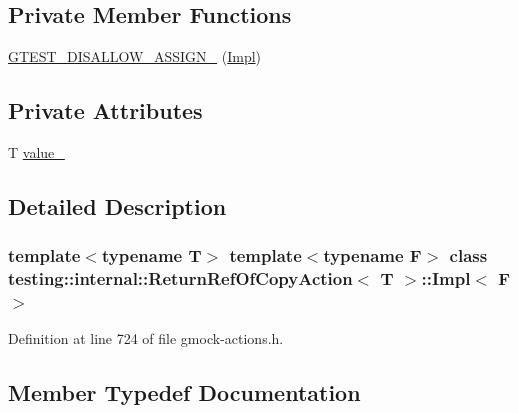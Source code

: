 \subsection*{Private Member Functions}
\begin{DoxyCompactItemize}
\item 
\hyperlink{classtesting_1_1internal_1_1ReturnRefOfCopyAction_1_1Impl_a380485fdbcb248ca267bf190202607c5}{G\+T\+E\+S\+T\+\_\+\+D\+I\+S\+A\+L\+L\+O\+W\+\_\+\+A\+S\+S\+I\+G\+N\+\_\+} (\hyperlink{classtesting_1_1internal_1_1ReturnRefOfCopyAction_1_1Impl}{Impl})
\end{DoxyCompactItemize}
\subsection*{Private Attributes}
\begin{DoxyCompactItemize}
\item 
T \hyperlink{classtesting_1_1internal_1_1ReturnRefOfCopyAction_1_1Impl_ad253b5cad2707636b8b19970708905c3}{value\+\_\+}
\end{DoxyCompactItemize}


\subsection{Detailed Description}
\subsubsection*{template$<$typename T$>$\newline
template$<$typename F$>$\newline
class testing\+::internal\+::\+Return\+Ref\+Of\+Copy\+Action$<$ T $>$\+::\+Impl$<$ F $>$}



Definition at line 724 of file gmock-\/actions.\+h.



\subsection{Member Typedef Documentation}
\mbox{\label{classtesting_1_1internal_1_1ReturnRefOfCopyAction_1_1Impl_aae70fc272cfaa8efebffffdeaca36cea}} 
